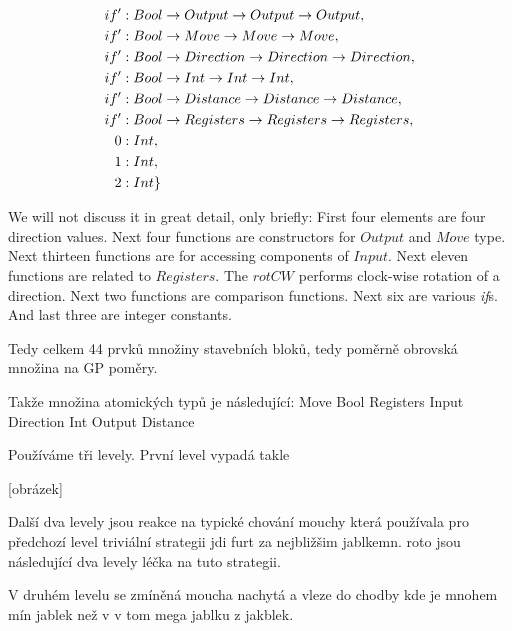 \documentclass[12pt,a4paper]{report}
\begin{document}
\begin{align*}
if'              &: Bool \rightarrow Output \rightarrow Output \rightarrow Output           ,\\                                  
if'              &: Bool \rightarrow Move \rightarrow Move \rightarrow Move                 ,\\                                  
if'              &: Bool \rightarrow Direction \rightarrow Direction \rightarrow Direction  ,\\              
if'              &: Bool \rightarrow Int \rightarrow Int \rightarrow Int                    ,\\     
if'              &: Bool \rightarrow Distance \rightarrow Distance \rightarrow Distance     ,\\        
if'              &: Bool \rightarrow Registers \rightarrow Registers \rightarrow Registers  ,\\                           
0                &: Int                                             ,\\                                     
1                &: Int                                             ,\\                                    
2                &: Int                                             \}\\
\end{align*}

We will not discuss it in great detail, only briefly: First four 
elements are four direction values. Next four functions are
constructors for $Output$ and $Move$ type. Next thirteen functions
are for accessing components of $Input$. Next eleven functions are 
related to $Registers$. The $rotCW$ performs clock-wise rotation of a direction.
Next two functions are comparison functions. Next six are various \textit{if}s. And last 
three are integer constants. 

Tedy celkem 44 prvků množiny stavebních bloků, tedy poměrně obrovská množina
na GP poměry.

Takže množina atomických typů je následující:
Move Bool Registers Input Direction Int Output Distance

Používáme tři levely. První level vypadá takle

[obrázek]

Další dva levely jsou reakce na typické chování mouchy 
která používala pro předchozí level triviální strategii
jdi furt za nejbližšim jablkemn. roto jsou následující dva levely 
léčka na tuto strategii.

V druhém levelu se zmíněná moucha nachytá a vleze do 
chodby kde je mnohem mín jablek než v v tom mega jablku z jakblek.
\end{document}
